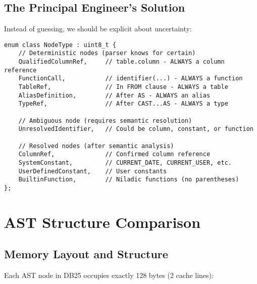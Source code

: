 \documentclass[11pt,a4paper]{article}
\begin{document}
\subsection{The Principal Engineer's Solution}

Instead of guessing, we should be explicit about uncertainty:

\begin{lstlisting}[style=cpp]
enum class NodeType : uint8_t {
    // Deterministic nodes (parser knows for certain)
    QualifiedColumnRef,     // table.column - ALWAYS a column reference
    FunctionCall,           // identifier(...) - ALWAYS a function
    TableRef,               // In FROM clause - ALWAYS a table
    AliasDefinition,        // After AS - ALWAYS an alias
    TypeRef,                // After CAST...AS - ALWAYS a type
    
    // Ambiguous node (requires semantic resolution)  
    UnresolvedIdentifier,   // Could be column, constant, or function
    
    // Resolved nodes (after semantic analysis)
    ColumnRef,              // Confirmed column reference
    SystemConstant,         // CURRENT_DATE, CURRENT_USER, etc.
    UserDefinedConstant,    // User constants
    BuiltinFunction,        // Niladic functions (no parentheses)
};
\end{lstlisting}

\section{AST Structure Comparison}

\subsection{Memory Layout and Structure}

Each AST node in DB25 occupies exactly 128 bytes (2 cache lines):
\end{document}
